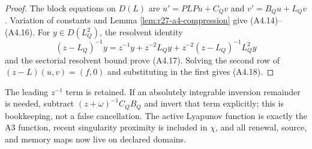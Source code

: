 \begin{proof}
The block equations on $D(L)$ are
$u'=PLPu+C_Qv$ and $v'=B_Qu+L_Qv$.  Variation of constants and Lemma
\ref{lem:r27-a4-compression} give (A4.14)--(A4.16).  For
$y\in D(L_Q^2)$, the resolvent identity
\[
 (z-L_Q)^{-1}y
 =z^{-1}y+z^{-2}L_Qy+z^{-2}(z-L_Q)^{-1}L_Q^2y
\]
and the sectorial resolvent bound prove (A4.17).  Solving the second row of
$(z-L)(u,v)=(f,0)$ and substituting in the first gives (A4.18).
\end{proof}

The leading $z^{-1}$ term is retained.  If an absolutely integrable inversion
remainder is needed, subtract
$(z+\omega)^{-1}C_QB_Q$ and invert that term explicitly; this is bookkeeping,
not a false cancellation.  The active Lyapunov function is exactly the A3
function, recent singularity proximity is included in $\chi$, and all
renewal, source, and memory maps now live on declared domains.
